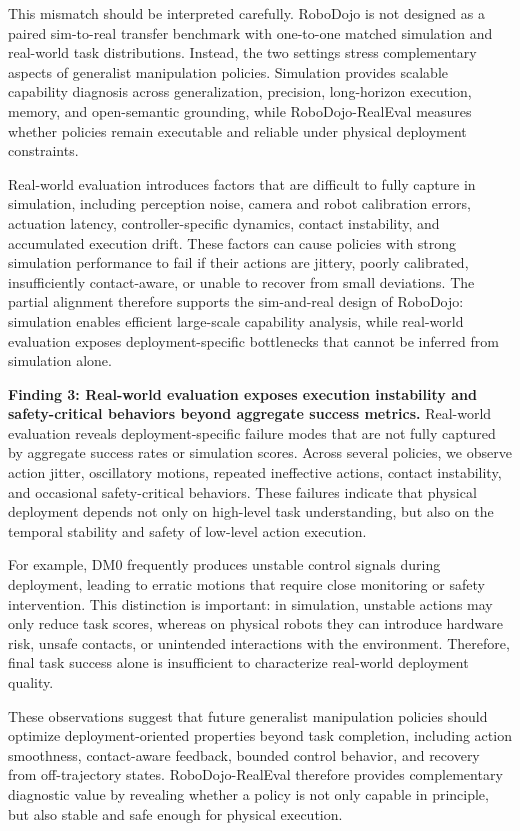 This mismatch should be interpreted carefully. RoboDojo is not designed as a paired sim-to-real transfer benchmark with one-to-one matched simulation and real-world task distributions. Instead, the two settings stress complementary aspects of generalist manipulation policies. Simulation provides scalable capability diagnosis across generalization, precision, long-horizon execution, memory, and open-semantic grounding, while RoboDojo-RealEval measures whether policies remain executable and reliable under physical deployment constraints.

Real-world evaluation introduces factors that are difficult to fully capture in simulation, including perception noise, camera and robot calibration errors, actuation latency, controller-specific dynamics, contact instability, and accumulated execution drift. These factors can cause policies with strong simulation performance to fail if their actions are jittery, poorly calibrated, insufficiently contact-aware, or unable to recover from small deviations. The partial alignment therefore supports the sim-and-real design of RoboDojo: simulation enables efficient large-scale capability analysis, while real-world evaluation exposes deployment-specific bottlenecks that cannot be inferred from simulation alone.

\textcolor{Blue_1}{\textbf{Finding 3: Real-world evaluation exposes execution instability and safety-critical behaviors beyond aggregate success metrics.}}
Real-world evaluation reveals deployment-specific failure modes that are not fully captured by aggregate success rates or simulation scores. Across several policies, we observe action jitter, oscillatory motions, repeated ineffective actions, contact instability, and occasional safety-critical behaviors. These failures indicate that physical deployment depends not only on high-level task understanding, but also on the temporal stability and safety of low-level action execution.

For example, DM0 frequently produces unstable control signals during deployment, leading to erratic motions that require close monitoring or safety intervention. This distinction is important: in simulation, unstable actions may only reduce task scores, whereas on physical robots they can introduce hardware risk, unsafe contacts, or unintended interactions with the environment. Therefore, final task success alone is insufficient to characterize real-world deployment quality.

These observations suggest that future generalist manipulation policies should optimize deployment-oriented properties beyond task completion, including action smoothness, contact-aware feedback, bounded control behavior, and recovery from off-trajectory states. RoboDojo-RealEval therefore provides complementary diagnostic value by revealing whether a policy is not only capable in principle, but also stable and safe enough for physical execution.